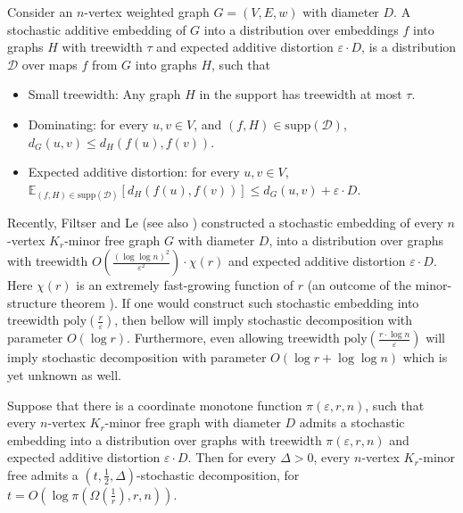 \documentclass{theoretics}
\newcommand{\poly}{\mathrm{poly}}
\newcommand{\supp}{\mathrm{supp}}
\newcommand{\calD}{\mathcal{D}}
\newcommand{\E}{{\mathbb{E}}}
\def\eps{\varepsilon}
\begin{document}
\begin{definition} Consider an $n$-vertex weighted graph $G=(V,E,w)$ with diameter $D$. A
	stochastic additive embedding of $G$ into a distribution over embeddings $f$ into graphs $H$ with treewidth $\tau$ and expected additive distortion $\eps\cdot D$, is a distribution $\calD$ over maps $f$ from $G$ into graphs $H$, such that
	\begin{itemize}
		\item Small treewidth: Any graph $H$ in the support has treewidth at most $\tau$.
		\item Dominating: for every $u, v\in V$, and $(f,H)\in\supp(\calD)$, $d_G(u, v)\le d_H(f(u),f(v))$.
		\item Expected additive distortion: for every $u, v\in V$, $\E_{(f,H)\in\supp(\calD)}\left[d_H(f(u),f(v))\right]\le d_G(u,v)+\eps\cdot D$.
	\end{itemize}  
\end{definition}
Recently, Filtser and Le \cite{FL22} (see also \cite{FKS19,CFKL20,FL21}) constructed a stochastic embedding of every $n$-vertex $K_r$-minor free graph $G$ with diameter $D$, into a distribution over graphs with treewidth $O(\frac{(\log\log n)^2}{\eps^2})\cdot \chi(r)$ and expected additive distortion $\eps\cdot D$. Here $\chi(r)$ is an extremely fast-growing function of $r$ (an outcome of the minor-structure theorem \cite{RS03}). 
If one would construct such stochastic embedding into treewidth $\poly(\frac r\eps)$, then  bellow will imply stochastic decomposition with parameter $O(\log r)$. Furthermore, even allowing treewidth $\poly(\frac {r\cdot\log n}{\eps})$ will imply stochastic decomposition with parameter $O(\log r+\log\log n)$ which is yet unknown as well.
\begin{lemma}\label{lem:AdditiveEmbeddingToDecomposition}
	Suppose that there is a coordinate monotone function $\pi(\eps,r,n)$, such that every $n$-vertex $K_r$-minor free graph with diameter $D$ admits a stochastic embedding into a distribution over graphs with treewidth $\pi(\eps,r,n)$ and expected additive distortion $\eps\cdot D$.
	Then for every $\Delta>0$, every $n$-vertex $K_r$-minor free admits a $(t,\frac12,\Delta)$-stochastic decomposition, for $t=O(\log\pi(\Omega(\frac{1}{r}),r,n))$.
\end{lemma}
\end{document}
